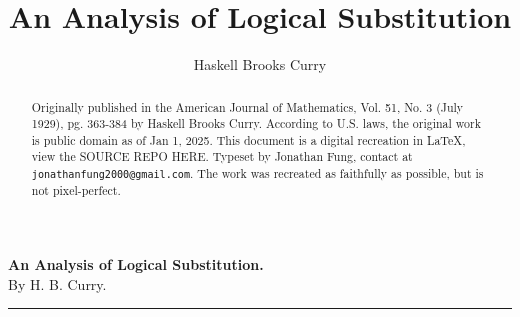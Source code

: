 \documentclass[10pt, twoside]{extarticle}
\title{An Analysis of Logical Substitution}%
\author{Haskell Brooks Curry}%
\theoremstyle{breaktheorem}
\theoremstyle{mylemma}
\theoremstyle{mydefinition}
\theoremstyle{mycorollary}
\begin{document}
%

\makeatletter
\renewcommand\footnoterule{%
  \kern-3\p@
  \hrule\@width6em
  \kern2.6\p@}
\makeatother

\let\oldfootnote\footnote
\renewcommand\footnote[1]{%
\oldfootnote{\hspace{0.3em}#1}}

\setcounter{page}{363}
\begin{center}
\large\textbf{An Analysis of Logical Substitution.} \\
\normalsize By H. B. Curry. \\
\rule{5em}{0.7pt}
\end{center}

\renewcommand{\contentsname}{Contents.\footnote{The three parts of this paper are to a certain extent independent of one another. However, certain definitions needed in \Cref{part:III} are given in the last six paragraphs of \Cref{part:II}.} \hfill}
\tableofcontents

\pagestyle{fancy}
\renewcommand{\headrulewidth}{0em}
\fancyhead{} %
\fancyhead[LE, RO]{\thepage}
\fancyfoot{} %

\renewcommand{\abstractname}{\vspace{-\baselineskip}}%
\begin{abstract}
  \begin{itshape}
    \noindent Originally published in the American Journal of Mathematics, Vol. 51, No. 3 (July 1929), pg. 363-384 by Haskell Brooks Curry. According to U.S. laws, the original work is public domain as of Jan 1, 2025.
    This document is a digital recreation in \LaTeX{}, view the SOURCE REPO HERE.
    Typeset by Jonathan Fung, contact at \texttt{jonathanfung2000@gmail.com}.
    The work was recreated as faithfully as possible, but is not pixel-perfect.
  \end{itshape}
\end{abstract}
\end{document}
